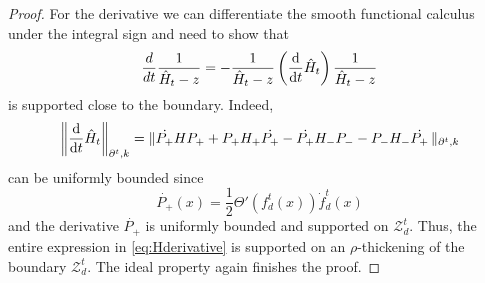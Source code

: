\documentclass[12pt]{amsart}
\newcommand{\Zz}{{\mathcal Z}}
\newcommand{\pdv}{\partial}
\newcommand{\difd}{\textup{d}}
\newcommand{\scalarmatrix}{H_-}
\begin{document}
\begin{proof}
For the derivative we can differentiate the smooth functional calculus under the integral sign and need to show that
$$\frac{d}{dt}\frac{1}{\hat{H}_t - z} = - \frac{1}{\hat{H}_t - z} \left(\frac{\difd}{\difd t}\hat{H}_t\right) \frac{1}{\hat{H}_t - z}$$
is supported close to the boundary. Indeed,
\begin{equation}
\label{eq:Hderivative}
\bigg\|\frac{\difd}{\difd t}\hat{H}_t\bigg\|_{\pdv^t,k} = \| \dot{P_+} H P_+ + P_+ H_+ \dot{P_+} - \dot{P_+}\scalarmatrix P_- - P_-\scalarmatrix \dot{P_+} \, \|_{\pdv^{t},k} 
\end{equation}
can be uniformly bounded since
$$\dot{P_+}(x)= \frac12{\Theta'}(f_d^t(x))\dot{f}_d^t(x)$$
and the derivative $\dot{P_+}$ is uniformly bounded and supported on $\Zz_d^{t}$.
Thus, the entire expression in \eqref{eq:Hderivative} is supported on an $\rho$-thickening of the boundary $\Zz_d^t$. The ideal property again finishes the proof.

\end{proof}
\end{document}
